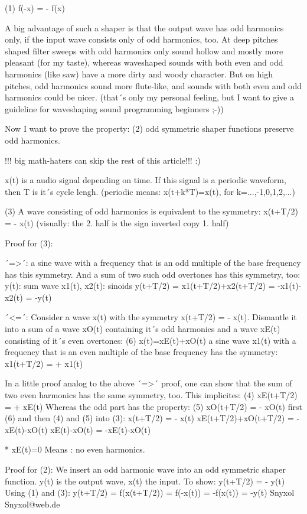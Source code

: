 {	(1) f(-x) = - f(x)
	
	A big advantage of such a shaper is that the output wave has odd harmonics only, if the input wave consists only of odd harmonics, too. At deep pitches shaped filter sweeps with odd harmonics only sound hollow and mostly more pleasant (for my taste), whereas waveshaped sounds with both even and odd harmonics (like saw) have a more dirty and woody character. But on high pitches, odd harmonics sound more flute-like, and sounds with both even and odd harmonics could be nicer. (that´s only my personal feeling, but I want to give a guideline for waveshaping sound programming beginners ;-))
	
	Now I want to prove the property:
	(2) odd symmetric shaper functions preserve odd harmonics.
	
	!!! big math-haters can skip the rest of this article!!! :)
	
	x(t) is a audio signal depending on time. If this signal is a periodic waveform, then T is it´s cycle lengh.
	(periodic means: x(t+k*T)=x(t), for k=...,-1,0,1,2,...)
	
	(3) A wave consisting of odd harmonics is equivalent to the symmetry:
	x(t+T/2) = - x(t)
	(visually: the 2. half is the sign inverted copy 1. half)
	
	Proof for (3):
	
	´=>´: a sine wave with a frequency that is an odd multiple of the base frequency has this symmetry. And a sum of two such odd overtones has this symmetry, too:
	y(t): sum wave
	x1(t), x2(t): sinoids
	y(t+T/2) = x1(t+T/2)+x2(t+T/2) = -x1(t)-x2(t) = -y(t)
	
	´<=´: Consider a wave x(t) with the symmetry x(t+T/2) = - x(t). Dismantle it into a sum of a wave xO(t) containing it´s odd harmonics and a wave xE(t) consisting of it´s even overtones:
	(6) x(t)=xE(t)+xO(t)
	a sine wave x1(t) with a frequency that is an even multiple of the base frequency has the symmetry:
	x1(t+T/2) = + x1(t)
	
	In a little proof analog to the above ´=>´ proof, one can show that the sum of two even harmonics has the same symmetry, too. This implicites:
	(4) xE(t+T/2) = + xE(t)
	Whereas the odd part has the property:
	(5) xO(t+T/2) = - xO(t)
	first (6) and then (4) and (5) into (3):
	x(t+T/2) = - x(t)
	xE(t+T/2)+xO(t+T/2) = -xE(t)-xO(t)
	xE(t)-xO(t) = -xE(t)-xO(t)
	
	* xE(t)=0
	Means : no even harmonics.
	
	Proof for (2):
	We insert an odd harmonic wave into an odd symmetric shaper function.
	y(t) is the output wave, x(t) the input.
	To show: y(t+T/2) = - y(t)
	Using (1) and (3):
	y(t+T/2) = f(x(t+T/2)) = f(-x(t)) = -f(x(t)) = -y(t)
	Snyxol
	Snyxol@web.de
	
}
